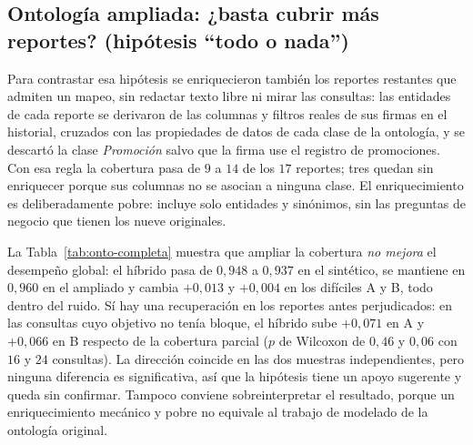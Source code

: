 \documentclass[11pt,letterpaper]{article}
\numberwithin{equation}{section}
\begin{document}
\subsection{Ontología ampliada: ¿basta cubrir más reportes? (hipótesis ``todo o nada'')}
\label{sec:res-onto-completa}
Para contrastar esa hipótesis se enriquecieron también los reportes restantes que admiten un mapeo, sin redactar texto libre ni mirar las consultas: las entidades de cada reporte se derivaron de las columnas y filtros reales de sus firmas en el historial, cruzados con las propiedades de datos de cada clase de la ontología, y se descartó la clase \emph{Promoción} salvo que la firma use el registro de promociones. Con esa regla la cobertura pasa de $9$ a $14$ de los $17$ reportes; tres quedan sin enriquecer porque sus columnas no se asocian a ninguna clase. El enriquecimiento es deliberadamente pobre: incluye solo entidades y sinónimos, sin las preguntas de negocio que tienen los nueve originales.

La Tabla~\ref{tab:onto-completa} muestra que ampliar la cobertura \emph{no mejora} el desempeño global: el híbrido pasa de $0{,}948$ a $0{,}937$ en el sintético, se mantiene en $0{,}960$ en el ampliado y cambia $+0{,}013$ y $+0{,}004$ en los difíciles A y B, todo dentro del ruido. Sí hay una recuperación en los reportes antes perjudicados: en las consultas cuyo objetivo no tenía bloque, el híbrido sube $+0{,}071$ en A y $+0{,}066$ en B respecto de la cobertura parcial ($p$ de Wilcoxon de $0{,}46$ y $0{,}06$ con $16$ y $24$ consultas). La dirección coincide en las dos muestras independientes, pero ninguna diferencia es significativa, así que la hipótesis tiene un apoyo sugerente y queda sin confirmar. Tampoco conviene sobreinterpretar el resultado, porque un enriquecimiento mecánico y pobre no equivale al trabajo de modelado de la ontología original.
\end{document}
